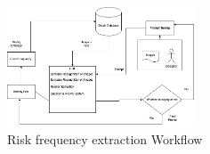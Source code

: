 \begin{figure}
    \label{fig:risk_frequency_workflow}
    \centering
    \includegraphics[width=0.5\textwidth]{figures/Data properties enrichment.png.png}
    \caption{Risk frequency extraction Workflow}
\end{figure}
\begin{table}[htbp]
    \centering
    \label{tab:risk_frequency_sample}
    

\end{table}
